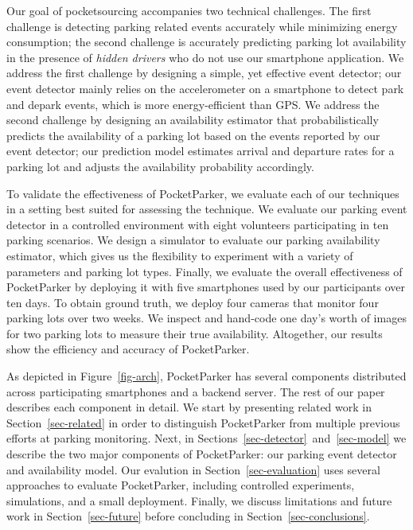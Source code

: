 Our goal of pocketsourcing accompanies two technical challenges. The first
challenge is detecting parking related events accurately while minimizing energy
consumption; the second challenge is accurately predicting parking lot
availability in the presence of {\it hidden drivers} who do not use our
smartphone application. We address the first challenge by designing a simple,
yet effective event detector; our event detector mainly relies on the
accelerometer on a smartphone to detect park and depark events, which is more
energy-efficient than GPS. We address the second challenge by designing an
availability estimator that probabilistically predicts the availability of a
parking lot based on the events reported by our event detector; our prediction
model estimates arrival and departure rates for a parking lot and adjusts the
availability probability accordingly.

To validate the effectiveness of PocketParker, we evaluate each of our
techniques in a setting best suited for assessing the technique. We evaluate
our parking event detector in a controlled environment with eight volunteers
participating in ten parking scenarios. We design a simulator to evaluate our
parking availability estimator, which gives us the flexibility to experiment
with a variety of parameters and parking lot types. Finally, we evaluate the
overall effectiveness of PocketParker by deploying it with five smartphones used
by our participants over ten days. To obtain ground truth, we deploy four
cameras that monitor four parking lots over two weeks. We inspect and hand-code
one day's worth of images for two parking lots to measure their true
availability. Altogether, our results show the efficiency and accuracy of
PocketParker.

As depicted in Figure~\ref{fig-arch}, PocketParker has several components
distributed across participating smartphones and a backend server. The rest of
our paper describes each component in detail. We start by presenting related
work in Section~\ref{sec-related} in order to distinguish PocketParker from
multiple previous efforts at parking monitoring. Next, in
Sections~\ref{sec-detector}~and~\ref{sec-model} we describe the two major
components of PocketParker: our parking event detector and availability
model. Our evalution in Section~\ref{sec-evaluation} uses several approaches
to evaluate PocketParker, including controlled experiments, simulations, and
a small deployment. Finally, we discuss limitations and future work in
Section~\ref{sec-future} before concluding in Section~\ref{sec-conclusions}.

